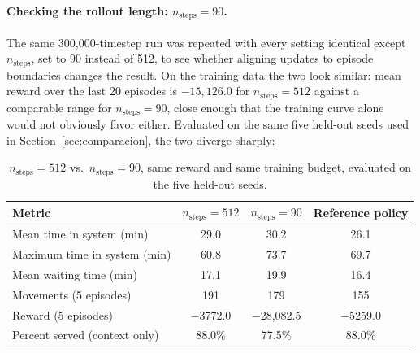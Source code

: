 \documentclass[11pt,a4paper]{article}
\begin{document}
\paragraph{Checking the rollout length: $n_{\text{steps}}=90$.} The same 300{,}000-timestep run was repeated with every setting identical except $n_{\text{steps}}$, set to 90 instead of 512, to see whether aligning updates to episode boundaries changes the result. On the training data the two look similar: mean reward over the last 20 episodes is $-15{,}126.0$ for $n_{\text{steps}}=512$ against a comparable range for $n_{\text{steps}}=90$, close enough that the training curve alone would not obviously favor either. Evaluated on the same five held-out seeds used in Section~\ref{sec:comparacion}, the two diverge sharply:

\begin{table}[H]
\centering
\caption{$n_{\text{steps}}=512$ vs.\ $n_{\text{steps}}=90$, same reward and same training budget, evaluated on the five held-out seeds.}
\label{tab:n-steps}
\small
\begin{tabular}{lccc}
\toprule
Metric & $n_{\text{steps}}=512$ & $n_{\text{steps}}=90$ & Reference policy \\
\midrule
Mean time in system (min) & 29.0 & 30.2 & 26.1 \\
Maximum time in system (min) & 60.8 & 73.7 & 69.7 \\
Mean waiting time (min) & 17.1 & 19.9 & 16.4 \\
Movements (5 episodes) & 191 & 179 & 155 \\
Reward (5 episodes) & $-$3772.0 & $-$28{,}082.5 & $-$5259.0 \\
Percent served (context only) & 88.0\% & 77.5\% & 88.0\% \\
\bottomrule
\end{tabular}
\end{table}
\end{document}
